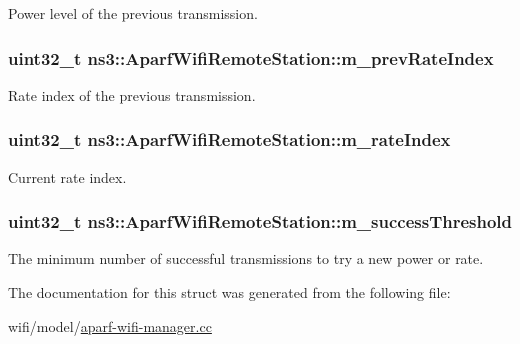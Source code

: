 Power level of the previous transmission. 

\subsubsection[{\texorpdfstring{m\+\_\+prev\+Rate\+Index}{m_prevRateIndex}}]{\setlength{\rightskip}{0pt plus 5cm}uint32\+\_\+t ns3\+::\+Aparf\+Wifi\+Remote\+Station\+::m\+\_\+prev\+Rate\+Index}\hypertarget{structns3_1_1AparfWifiRemoteStation_a2f7bbb403bb0b2da8bc7e10bbac3c2a2}{}\label{structns3_1_1AparfWifiRemoteStation_a2f7bbb403bb0b2da8bc7e10bbac3c2a2}


Rate index of the previous transmission. 

\subsubsection[{\texorpdfstring{m\+\_\+rate\+Index}{m_rateIndex}}]{\setlength{\rightskip}{0pt plus 5cm}uint32\+\_\+t ns3\+::\+Aparf\+Wifi\+Remote\+Station\+::m\+\_\+rate\+Index}\hypertarget{structns3_1_1AparfWifiRemoteStation_a918c95438b101ff4c90d83cdd80d054b}{}\label{structns3_1_1AparfWifiRemoteStation_a918c95438b101ff4c90d83cdd80d054b}


Current rate index. 

\subsubsection[{\texorpdfstring{m\+\_\+success\+Threshold}{m_successThreshold}}]{\setlength{\rightskip}{0pt plus 5cm}uint32\+\_\+t ns3\+::\+Aparf\+Wifi\+Remote\+Station\+::m\+\_\+success\+Threshold}\hypertarget{structns3_1_1AparfWifiRemoteStation_a231765edd2ba7b5a9152819770adea26}{}\label{structns3_1_1AparfWifiRemoteStation_a231765edd2ba7b5a9152819770adea26}


The minimum number of successful transmissions to try a new power or rate. 



The documentation for this struct was generated from the following file\+:\begin{DoxyCompactItemize}
\item 
wifi/model/\hyperlink{aparf-wifi-manager_8cc}{aparf-\/wifi-\/manager.\+cc}\end{DoxyCompactItemize}
